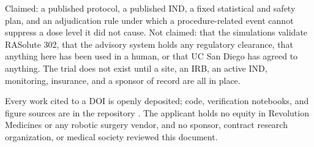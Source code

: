 \vspace{-0.2em}

Claimed: a published protocol, a published IND, a fixed statistical and safety
plan, and an adjudication rule under which a procedure-related event cannot
suppress a dose level it did not cause. Not claimed: that the simulations validate
RASolute 302, that the advisory system holds any regulatory clearance, that
anything here has been used in a human, or that UC San Diego has agreed to
anything. The trial does not exist until a site, an IRB, an active IND,
monitoring, insurance, and a sponsor of record are all in place.

\vspace{-0.2em}

Every work cited to a DOI is openly deposited; code, verification notebooks, and
figure sources are in the repository \cite{repo2026}. The applicant holds no
equity in Revolution Medicines or any robotic surgery vendor, and no sponsor,
contract research organization, or medical society reviewed this document.

\vspace{0.1em}
\apprule{0.4pt}
\vspace{-0.1em}

\vspace{-0.35em}
\begin{apprefs}


\end{apprefs}
